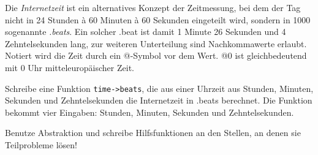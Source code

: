 \begin{aufgabe} Die \textit{Internetzeit} ist ein alternatives Konzept
  der Zeitmessung, bei dem der Tag nicht in 24 Stunden \`a 60 Minuten
  \`a 60 Sekunden eingeteilt wird, sondern in 1000 sogenannte
  \textit{.beats}.  Ein solcher .beat ist damit 1 Minute 26 Sekunden
  und 4 Zehntelsekunden lang, zur weiteren Unterteilung sind
  Nachkommawerte erlaubt.  Notiert wird die Zeit durch ein @-Symbol
  vor dem Wert.  @0 ist gleichbedeutend mit 0 Uhr mitteleuropäischer
  Zeit.

  Schreibe eine Funktion \lstinline{time->beats}, die aus einer Uhrzeit
  aus Stunden, Minuten, Sekunden und Zehntelsekunden die Internetzeit
  in .beats berechnet.  Die Funktion bekommt vier Eingaben: Stunden,
  Minuten, Sekunden und Zehntelsekunden.

  Benutze Abstraktion und schreibe Hilfsfunktionen an den Stellen, an
  denen sie Teilprobleme lösen!
\end{aufgabe}


